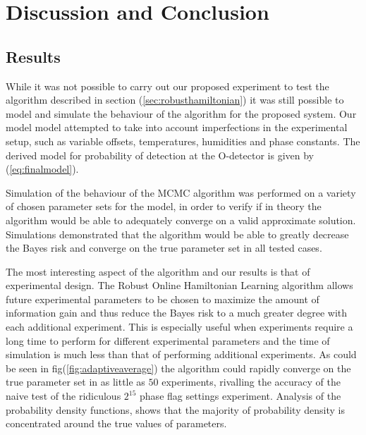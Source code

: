 
\chapter{Discussion and Conclusion} %
\label{Chapter5}

\section{Results}
While it was not possible to carry out our proposed experiment to test the algorithm described in section (\ref{sec:robusthamiltonian}) it was still possible to model and simulate the behaviour of the algorithm for the proposed system. Our model model attempted to take into account imperfections in the experimental setup, such as variable offsets, temperatures, humidities and phase constants. The derived model for probability of detection at the O-detector is given by (\ref{eq:finalmodel}).

Simulation of the behaviour of the MCMC algorithm was performed on a variety of chosen parameter sets for the model, in order to verify if in theory the algorithm would be able to adequately converge on a valid approximate solution. Simulations demonstrated that the algorithm would be able to greatly decrease the Bayes risk and converge on the true parameter set in all tested cases.   

The most interesting aspect of the algorithm and our results is that of experimental design. The Robust Online Hamiltonian Learning algorithm allows future experimental parameters to be chosen to maximize the amount of information gain and thus reduce the Bayes risk to a much greater degree with each additional experiment. This is especially useful when experiments require a long time to perform for different experimental parameters and the time of simulation is much less than that of performing additional experiments. As could be seen in fig(\ref{fig:adaptiveaverage}) the algorithm could rapidly converge on the true parameter set in as little as $50$ experiments, rivalling the accuracy of the naive test of the ridiculous $2^15$ phase flag settings experiment. Analysis of the probability density functions, shows that the majority of probability density is concentrated around the true values of parameters. 

